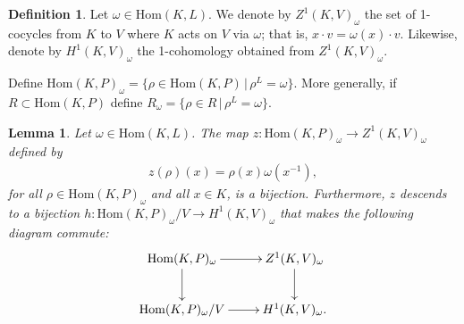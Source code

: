 \documentclass[12pt]{amsart}
\numberwithin{equation}{section}
\newtheorem{lem}[equation]{Lemma}
\theoremstyle{definition}
\newtheorem{defn}[equation]{Definition}
\theoremstyle{remark}
\theoremstyle{remark}
\begin{document}
\begin{defn}\label{h1sigma} Let $\omega \in \mathrm{Hom}(K, L)$. We denote by
$Z^1(K, V)_\omega$
the set of 1-cocycles from $K$ to $V$ where $K$ acts on $V$ via $\omega$;
that is, $x \cdot v = \omega(x) \cdot v$.
Likewise, denote by
$H^1(K, V)_\omega$
the 1-cohomology obtained from $Z^1(K, V)_\omega$.

Define
$\mathrm{Hom}(K, P)_\omega = \{ \rho \in \mathrm{Hom}(K, P) \,|\, \rho^L = \omega\}$.
More generally, if $R \subset \mathrm{Hom}(K, P)$ define
$R_\omega = \{ \rho \in R \,|\, \rho^L = \omega \}$.
\end{defn}

\begin{lem}
  Let $\omega \in \mathrm{Hom}(K, L)$. The map
$z: \mathrm{Hom}(K, P)_{\omega} \rightarrow Z^1(K, V)_\omega$
defined by
\begin{align*} z(\rho)(x) = \rho(x)\omega(x^{-1}), \end{align*}
for all $\rho \in \mathrm{Hom}(K, P)_\omega$ and all $x \in K$, is a bijection.
\label{lem:hom_z1}
%
Furthermore, $z$ descends to a bijection $h:\mathrm{Hom}(K, P)_\omega / V \rightarrow H^1(K, V)_\omega$ that makes the following diagram commute:
  \begin{align*}
    \xymatrix{
    \mathrm{Hom}(K, P)_{\omega}   \ar[r] \ar[d] & Z^{1}(K, V)_\omega \ar[d] \\
    \mathrm{Hom}(K, P)_{\omega}/V \ar[r]        & H^{1}(K, V)_\omega.
    }
  \end{align*}
  \label{lem:v_h1}
\end{lem}
\end{document}
